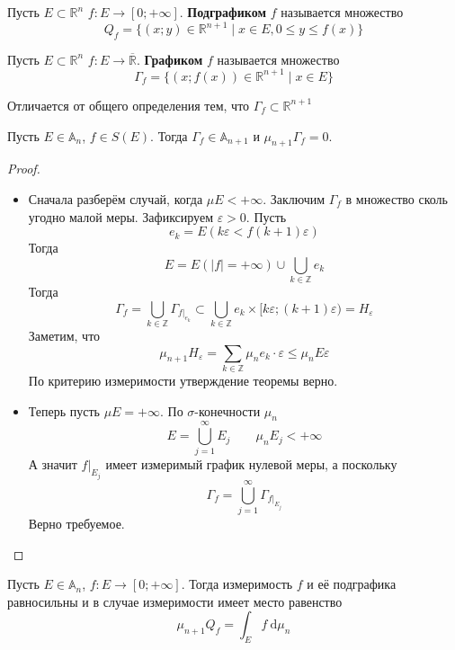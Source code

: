 \documentclass{article}
\let\eps\varepsilon
\begin{document}
    \tableofcontents
    \begin{definition}
        Пусть $E\subset \mathbb R^n$ $f\colon E\to[0;+\infty]$. \textbf{Подграфиком} $f$ называется множество
        $$
        Q_f=\{(x;y)\in\mathbb R^{n+1}\mid x\in E,0\leqslant y\leqslant f(x)\}
        $$
    \end{definition}
    \begin{definition}
        Пусть $E\subset \mathbb R^n$ $f\colon E\to\overline{\mathbb R}$. \textbf{Графиком} $f$ называется множество
        $$
        \Gamma_f=\{(x;f(x))\in\mathbb R^{n+1}\mid x\in E\}
        $$
    \end{definition}
    \begin{remark}
        Отличается от общего определения тем, что $\Gamma_f\subset\mathbb R^{n+1}$
    \end{remark}
    \begin{theorem}
        \label{О мере графика}
        Пусть $E\in\mathbb A_n$, $f\in S(E)$. Тогда $\Gamma_f\in\mathbb A_{n+1}$ и $\mu_{n+1}\Gamma_f=0$.
    \end{theorem}
    \begin{proof}
        \begin{itemize}
            \item Сначала разберём случай, когда $\mu E<+\infty$. Заключим $\Gamma_f$ в множество сколь угодно малой меры. Зафиксируем $\eps>0$. Пусть
            $$
            e_k=E(k\eps<f(k+1)\eps)
            $$
            Тогда
            $$
            E=E(|f|=+\infty)\cup\bigcup\limits_{k\in\mathbb Z}e_k
            $$
            Тогда
            $$
            \Gamma_f=\bigcup\limits_{k\in\mathbb Z}\Gamma_{f\big|_{e_k}}\subset\bigcup\limits_{k\in\mathbb Z}e_k\times[k\eps;(k+1)\eps)=H_\eps
            $$
            Заметим, что
            $$
            \mu_{n+1}H_\eps=\sum\limits_{k\in\mathbb Z}\mu_ne_k\cdot\eps\leqslant\mu_nE\eps
            $$
            По критерию измеримости утверждение теоремы верно.
            \item Теперь пусть $\mu E=+\infty$. По $\sigma$-конечности $\mu_n$
            $$
            E=\bigcup\limits_{j=1}^\infty E_j\qquad\mu_nE_j<+\infty
            $$
            А значит $f\Big|_{E_j}$ имеет измеримый график нулевой меры, а поскольку
            $$
            \Gamma_f=\bigcup\limits_{j=1}^\infty \Gamma_{f\big|_{E_j}}
            $$
            Верно требуемое.
        \end{itemize}
    \end{proof}
    \begin{theorem}
        \label{О мере подграфика}
        Пусть $E\in\mathbb A_n$, $f\colon E\to[0;+\infty]$. Тогда измеримость $f$ и её подграфика равносильны и в случае измеримости имеет место равенство
        $$
        \mu_{n+1}Q_f=\int_Ef~\mathrm d\mu_n
        $$
    \end{theorem}
\end{document}
